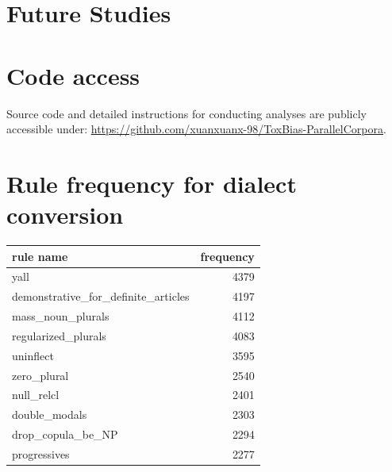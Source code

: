 \documentclass[11pt]{article}
\begin{document}
\section{Future Studies}







\appendix

\section{Code access}

Source code and detailed instructions for conducting analyses are publicly accessible under: \href{https://github.com/xuanxuanx-98/ToxBias-ParallelCorpora}{https://github.com/xuanxuanx-98/ToxBias-ParallelCorpora}.

\section{Rule frequency for dialect conversion} \label{rules}

\begin{center}
\begin{tabular}{lr}
\hline
\textbf{rule name}                     & \textbf{frequency} \\ \hline
yall                                   & 4379               \\
demonstrative\_for\_definite\_articles & 4197               \\
mass\_noun\_plurals                    & 4112               \\
regularized\_plurals                   & 4083               \\
uninflect                              & 3595               \\
zero\_plural                           & 2540               \\
null\_relcl                            & 2401               \\
double\_modals                         & 2303               \\
drop\_copula\_be\_NP                   & 2294               \\
progressives                           & 2277               \\ \hline
\end{tabular}
\end{center}
\end{document}
